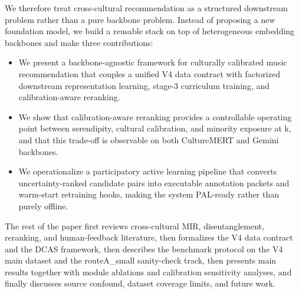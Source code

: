 We therefore treat cross-cultural recommendation as a structured downstream problem rather than a pure backbone problem. Instead of proposing a new foundation model, we build a reusable stack on top of heterogeneous embedding backbones and make three contributions:
\begin{itemize}
\item We present a backbone-agnostic framework for culturally calibrated music recommendation that couples a unified V4 data contract with factorized downstream representation learning, stage-3 curriculum training, and calibration-aware reranking.
\item We show that calibration-aware reranking provides a controllable operating point between serendipity, cultural calibration, and minority exposure at k, and that this trade-off is observable on both CultureMERT and Gemini backbones.
\item We operationalize a participatory active learning pipeline that converts uncertainty-ranked candidate pairs into executable annotation packets and warm-start retraining hooks, making the system PAL-ready rather than purely offline.
\end{itemize}

The rest of the paper first reviews cross-cultural MIR, disentanglement, reranking, and human-feedback literature, then formalizes the V4 data contract and the DCAS framework, then describes the benchmark protocol on the V4 main dataset and the routeA_small sanity-check track, then presents main results together with module ablations and calibration sensitivity analyses, and finally discusses source confound, dataset coverage limits, and future work.
